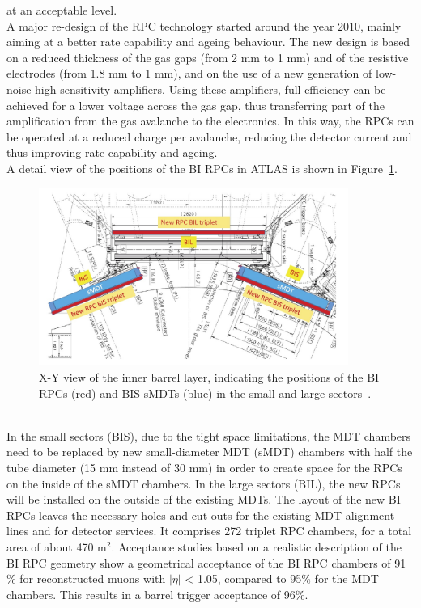 at an acceptable level.\\
A major re-design of the RPC technology started around the year 2010, mainly aiming at a
better rate capability and ageing behaviour. The new design is based on a reduced thickness
of the gas gaps (from 2 mm to 1 mm) and of the resistive electrodes (from 1.8 mm to
1 mm), and on the use of a new generation of low-noise high-sensitivity amplifiers. Using
these amplifiers, full efficiency can be achieved for a lower voltage across the gas gap, thus
transferring part of the amplification from the gas avalanche to the electronics. In this way,
the RPCs can be operated at a reduced charge per avalanche, reducing the detector current
and thus improving rate capability and ageing.\\
A detail view of the positions of the BI RPCs in ATLAS is shown in Figure~\ref{fig:xy_BIRPC}.
\begin{figure}[!h]
	\centering
	\includegraphics[width=0.9\textwidth]{Chapters/CH3/figures/xy_BIRPC}
	\caption{X-Y view of the inner barrel layer, indicating the positions of the BI RPCs (red) and BIS
sMDTs (blue) in the small and large sectors~\cite{TDR}.}
	\label{fig:xy_BIRPC}
\end{figure}
\\In the small sectors (BIS), due to the tight space limitations, the MDT chambers need to be 
replaced by new small-diameter MDT (sMDT) chambers with half the tube diameter (15 mm 
instead of 30 mm) in order to create space for the RPCs on the inside of the sMDT chambers. 
In  the large sectors (BIL), the new RPCs will be installed on the outside of the existing MDTs. The
layout of the new BI RPCs leaves the necessary holes and cut-outs for the existing MDT
alignment lines and for detector services. It comprises 272 triplet RPC chambers, for a total
area of about 470 $\mathrm{m^{2}}$. Acceptance studies based on a realistic description of the BI RPC geometry show a geometrical acceptance of the BI RPC chambers of 91$\%$ for reconstructed muons with $|\eta|$ < 1.05, compared to 95$\%$  for the MDT chambers. This results in a barrel trigger acceptance of 96$\%$.\\
